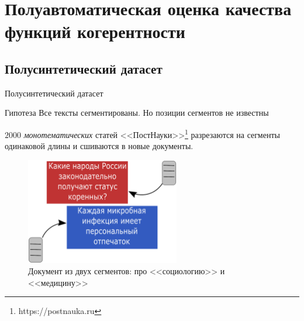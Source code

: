 \documentclass[sans, mathsans, russian]{beamer}
\begin{document}
\section{Полуавтоматическая оценка качества функций когерентности}

\subsection{Полусинтетический датасет}

\begin{frame}{Полусинтетический датасет}
  \begin{block}{Гипотеза}
    Все тексты сегментированы.
    Но позиции сегментов не известны
  \end{block}
  
  $2000$ \emph{монотематических} статей <<ПостНауки>>\footnote[frame]{https://postnauka.ru} разрезаются на сегменты одинаковой длины и сшиваются в новые документы.
    
  \begin{figure}[h]
    \centering
    \includegraphics[width=0.6\textwidth, height=0.45\textheight]{pn_gen_diagram.eps}
    \caption*{Документ из двух сегментов: про <<социологию>> и <<медицину>>}
  \end{figure}    
\end{frame}
\end{document}
